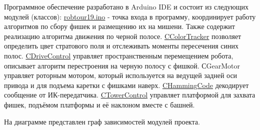 Программное обеспечение разработано в Arduino I\+DE и состоит из следующих модулей (классов)\+: \mbox{\hyperlink{robtour19_8ino}{robtour19.\+ino}} -\/ точка входа в программу, координирует работу алгоритмов по сбору фишек и размещению их на мишени. Также содержит реализацию алгоритма движения по черной полосе. \mbox{\hyperlink{class_c_color_tracker}{C\+Color\+Tracker}} позволяет определить цвет стратового поля и отслеживать моменты пересечения синих полос. \mbox{\hyperlink{class_c_drive_control}{C\+Drive\+Control}} управляет пространственным перемещением робота, описывает алгоритм перестроения на черную полосу с фишкой. С\+Gear\+Motor управляет роторным мотором, который используется на ведущей задней оси привода и для подъема каретки с фишками наверх. \mbox{\hyperlink{class_c_hamming_code}{C\+Hamming\+Code}} декодирует сообщение от ИК-\/передатчика. \mbox{\hyperlink{class_c_tower_control}{C\+Tower\+Control}} управляет платформой для захвата фишек, подъёмом платформы и её наклоном вместе с башней.

На диаграмме представлен граф зависимостей модулей проекта. 